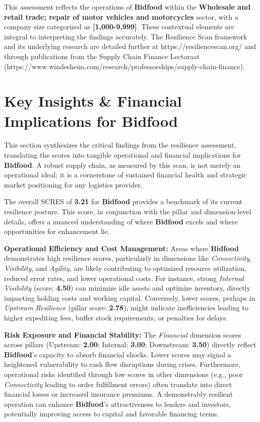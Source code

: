 \documentclass[
  oneside,
  open=any,
  fontsize=11pt]{scrbook}
\begin{document}
This assessment reflects the operations of \textbf{Bidfood} within the
\textbf{Wholesale and retail trade; repair of motor vehicles and
motorcycles} sector, with a company size categorized as
\textbf{{[}1,000-9,999{]}}. These contextual elements are integral to
interpreting the findings accurately. The Resilience Scan framework and
its underlying research are detailed further at
https://resiliencescan.org/ and through publications from the Supply
Chain Finance Lectoraat
(https://www.windesheim.com/research/professorships/supply-chain-finance).

\chapter{Key Insights \& Financial Implications for
Bidfood}\label{key-insights-financial-implications-for-bidfood}

This section synthesizes the critical findings from the resilience
assessment, translating the scores into tangible operational and
financial implications for \textbf{Bidfood}. A robust supply chain, as
measured by this scan, is not merely an operational ideal; it is a
cornerstone of sustained financial health and strategic market
positioning for any logistics provider.

The overall SCRES of \textbf{3.21} for \textbf{Bidfood} provides a
benchmark of its current resilience posture. This score, in conjunction
with the pillar and dimension-level details, offers a nuanced
understanding of where \textbf{Bidfood} excels and where opportunities
for enhancement lie.

\textbf{Operational Efficiency and Cost Management:} Areas where
\textbf{Bidfood} demonstrates high resilience scores, particularly in
dimensions like \emph{Connectivity}, \emph{Visibility}, and
\emph{Agility}, are likely contributing to optimized resource
utilization, reduced error rates, and lower operational costs. For
instance, strong \emph{Internal Visibility} (score: \textbf{4.50}) can
minimize idle assets and optimize inventory, directly impacting holding
costs and working capital. Conversely, lower scores, perhaps in
\emph{Upstream Resilience} (pillar score: \textbf{2.78}), might indicate
inefficiencies leading to higher expediting fees, buffer stock
requirements, or penalties for delays.

\textbf{Risk Exposure and Financial Stability:} The \emph{Financial}
dimension scores across pillars (Upstream: \textbf{2.00}; Internal:
\textbf{3.00}; Downstream: \textbf{3.50}) directly reflect
\textbf{Bidfood}'s capacity to absorb financial shocks. Lower scores may
signal a heightened vulnerability to cash flow disruptions during
crises. Furthermore, operational risks identified through low scores in
other dimensions (e.g., poor \emph{Connectivity} leading to order
fulfillment errors) often translate into direct financial losses or
increased insurance premiums. A demonstrably resilient operation can
enhance \textbf{Bidfood}'s attractiveness to lenders and investors,
potentially improving access to capital and favorable financing terms.
\end{document}
